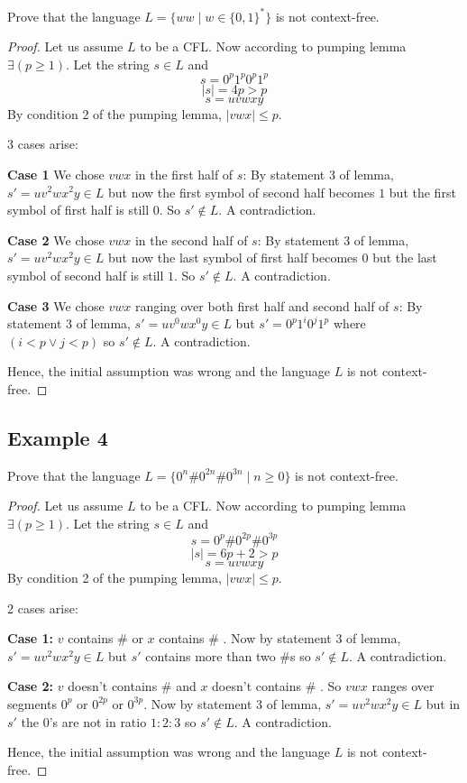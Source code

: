 \documentclass{article}
\begin{document}
Prove that the language $L=\{ww\mid w \in \{0,1\}^*  \}$ is not context-free.

\begin{proof}
Let us assume $L$ to be a CFL. Now according to pumping lemma $\exists(p\ge1)$.
Let the string $s\in L$ and $$s=0^p1^p0^p1^p$$ $$\mid s\mid=4p>p $$ $$s=uvwxy$$
By condition 2 of the pumping lemma, $|vwx| \leq p$. 

3 cases arise:

\textbf{Case 1} We chose $vwx$ in the first half of $s$: By statement 3 of lemma, $s'=uv^2wx^2y\in L$ but now the first symbol of second half becomes $1$ but the first symbol of first half is still $0$. So $s'\notin L$. A contradiction.

\textbf{Case 2} We chose $vwx$ in the second half of $s$: By statement 3 of lemma, $s'=uv^2wx^2y\in L$ but now the last symbol of first half becomes $0$ but the last symbol of second half is still $1$. So $s'\notin L$. A contradiction.

\textbf{Case 3} We chose $vwx$ ranging over both first half and second half of $s$: By statement 3 of lemma, $s'=uv^0wx^0y\in L$ but $s'=0^p1^i0^j1^p$ where  $(i< p \vee j < p)$ so $s'\notin L$. A contradiction.

Hence, the initial assumption was wrong and the language $L$ is not context-free.
\end{proof}

\subsection{Example 4}

Prove that the language $L=\{0^{n}\#0^{2n}\#0^{3n} \mid n\ge0  \}$ is not context-free.

\begin{proof}
Let us assume $L$ to be a CFL. Now according to pumping lemma $\exists(p\ge1)$.
Let the string $s\in L$ and $$s=0^{p}\#0^{2p}\#0^{3p}$$ $$\mid s\mid=6p+2>p $$ $$s=uvwxy$$
By condition 2 of the pumping lemma, $|vwx| \leq p$. 

2 cases arise:

\textbf{Case 1:} $v$ contains \# or $x$ contains \# .
Now by statement 3 of lemma, $s'=uv^2wx^2y\in L$ but $s'$ contains more than two \#s so $s'\notin L$. A contradiction.

\textbf{Case 2:} $v$ doesn't contains \# and $x$ doesn't contains \# . So $vwx$ ranges over segments $0^{p}$ or $0^{2p}$ or $0^{3p}$.
Now by statement 3 of lemma, $s'=uv^2wx^2y\in L$ but in $s'$ the $0$'s are not in ratio $1:2:3$ so $s'\notin L$. A contradiction.

Hence, the initial assumption was wrong and the language $L$ is not context-free.
\end{proof}
\end{document}
